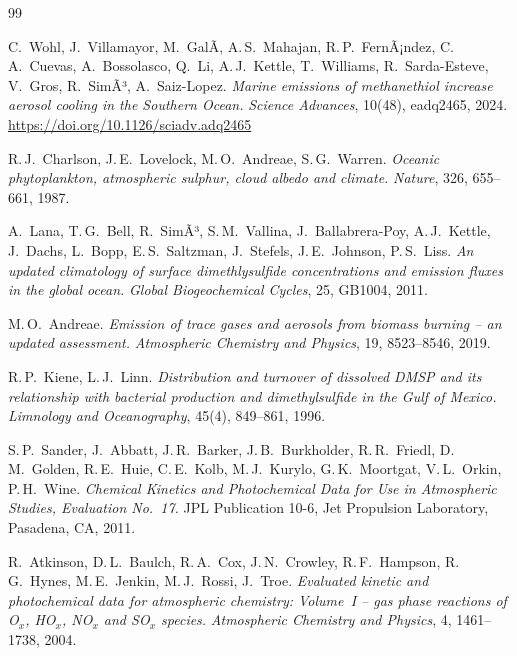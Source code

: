 ﻿\documentclass[a4paper,12pt]{article}
\theoremstyle{definition}
\begin{document}
\newpage
\begin{thebibliography}{99}

C.~Wohl, J.~Villamayor, M.~GalÃ­, A.\,S.~Mahajan, R.\,P.~FernÃ¡ndez, C.\,A.~Cuevas,
A.~Bossolasco, Q.~Li, A.\,J.~Kettle, T.~Williams, R.~Sarda-Esteve, V.~Gros, R.~SimÃ³,
A.~Saiz-Lopez.
\textit{Marine emissions of methanethiol increase aerosol cooling in the Southern Ocean.}
\textit{Science Advances}, 10(48), eadq2465, 2024.
\url{https://doi.org/10.1126/sciadv.adq2465}

R.\,J.~Charlson, J.\,E.~Lovelock, M.\,O.~Andreae, S.\,G.~Warren.
\textit{Oceanic phytoplankton, atmospheric sulphur, cloud albedo and climate.}
\textit{Nature}, 326, 655--661, 1987.

A.~Lana, T.\,G.~Bell, R.~SimÃ³, S.\,M.~Vallina, J.~Ballabrera-Poy, A.\,J.~Kettle,
J.~Dachs, L.~Bopp, E.\,S.~Saltzman, J.~Stefels, J.\,E.~Johnson, P.\,S.~Liss.
\textit{An updated climatology of surface dimethlysulfide concentrations and emission
fluxes in the global ocean.}
\textit{Global Biogeochemical Cycles}, 25, GB1004, 2011.

M.\,O.~Andreae.
\textit{Emission of trace gases and aerosols from biomass burning -- an updated
assessment.}
\textit{Atmospheric Chemistry and Physics}, 19, 8523--8546, 2019.

R.\,P.~Kiene, L.\,J.~Linn.
\textit{Distribution and turnover of dissolved DMSP and its relationship with bacterial
production and dimethylsulfide in the Gulf of Mexico.}
\textit{Limnology and Oceanography}, 45(4), 849--861, 1996.

S.\,P.~Sander, J.~Abbatt, J.\,R.~Barker, J.\,B.~Burkholder, R.\,R.~Friedl,
D.\,M.~Golden, R.\,E.~Huie, C.\,E.~Kolb, M.\,J.~Kurylo, G.\,K.~Moortgat,
V.\,L.~Orkin, P.\,H.~Wine.
\textit{Chemical Kinetics and Photochemical Data for Use in Atmospheric Studies,
Evaluation No.~17.}
JPL Publication 10-6, Jet Propulsion Laboratory, Pasadena, CA, 2011.

R.~Atkinson, D.\,L.~Baulch, R.\,A.~Cox, J.\,N.~Crowley, R.\,F.~Hampson,
R.\,G.~Hynes, M.\,E.~Jenkin, M.\,J.~Rossi, J.~Troe.
\textit{Evaluated kinetic and photochemical data for atmospheric chemistry:
Volume~I -- gas phase reactions of O$_x$, HO$_x$, NO$_x$ and SO$_x$ species.}
\textit{Atmospheric Chemistry and Physics}, 4, 1461--1738, 2004.


\end{thebibliography}
\end{document}
